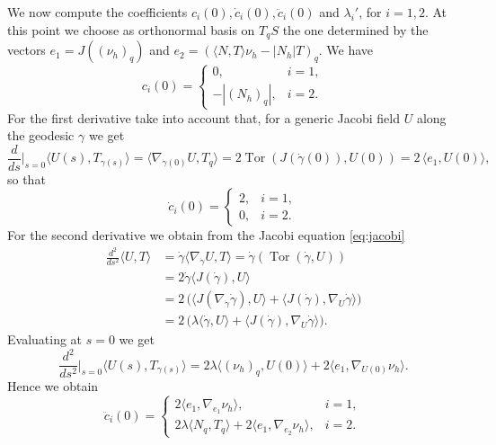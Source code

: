 \documentclass[10pt]{amsart}
\theoremstyle{definition}
\theoremstyle{remark}
\numberwithin{equation}{section}
\begin{document}
We now compute the coefficients $c_{i}(0),\dot{c}_{i}(0),\ddot{c}_{i}(0)$ and ${\lambda}_{i}'$, for $i=1,2$. At this point we choose as orthonormal basis on $T_qS$ the one determined by the vectors $e_1=J(({\nu_{h}})_q)$ and $e_2=({\langle{N,T}\rangle}{\nu_{h}}-|N_h|T)_q$. We have
\begin{equation}
\label{eq:ci}
c_{i}(0)=\begin{cases}
0, & i=1, \\
-|(N_{h})_{q}|, & i=2.
\end{cases}
\end{equation}
For the first derivative take into account that, for a generic Jacobi field $U$ along the geodesic ${\gamma}$ we get
\begin{equation}
\label{eq:ci'0}
\frac{d}{ds}\bigg|_{s=0}
{\langle{U(s),T_{{\gamma}(s)}}\rangle}={\langle{\nabla_{{\dot{\gamma}}(0)}U,T_{q}}\rangle}=2\operatorname{Tor}(J({\dot{\gamma}}(0)),U(0))=2\,{\langle{e_{1},U(0)}\rangle},
\end{equation}
so that
\begin{equation}
\label{eq:ci'}
\dot{c}_{i}(0)=\begin{cases}
2, & i=1,
\\
0, & i=2.
\end{cases}
\end{equation}
For the second derivative we obtain from the Jacobi equation \eqref{eq:jacobi}
\begin{align*}
\frac{d^2}{ds^2}
{\langle{U,T}\rangle}&={\dot{\gamma}}{\langle{\nabla_{\dot{\gamma}} U,T}\rangle}={\dot{\gamma}}(\operatorname{Tor}({\dot{\gamma}},U))
\\&=2{\dot{\gamma}}{\langle{J({\dot{\gamma}}),U}\rangle}
\\
&=2\,\big({\langle{J(\nabla_{\dot{\gamma}}{\dot{\gamma}}),U}\rangle}+{\langle{J({\dot{\gamma}}),\nabla_U{\dot{\gamma}}}\rangle}\big)
\\
&=2\,\big({\lambda}{\langle{{\dot{\gamma}},U}\rangle}+{\langle{J({\dot{\gamma}}),\nabla_U{\dot{\gamma}}}\rangle}\big).
\end{align*}
Evaluating at $s=0$ we get
\begin{equation}
\label{eq:ci''0}
\frac{d^2}{ds^2}\bigg|_{s=0}{\langle{U(s),T_{{\gamma}(s)}}\rangle}=2{\lambda}{\langle{({\nu_{h}})_q,U(0)}\rangle}+2{\langle{e_1,\nabla_{U(0)}{\nu_{h}}}\rangle}.
\end{equation}
Hence we obtain
\begin{equation*}
\ddot{c}_{i}(0)=\begin{cases}
2{\langle{e_1,\nabla_{e_1}{\nu_{h}}}\rangle}, & i=1,
\\
2{\lambda}{\langle{N_q,T_q}\rangle}+2{\langle{e_1,\nabla_{e_2}{\nu_{h}}}\rangle},
&i=2.
\end{cases}
\end{equation*}
\end{document}
